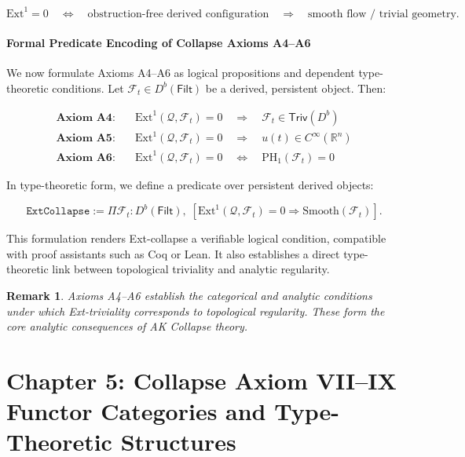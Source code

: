 \documentclass[11pt]{article}
\newtheorem{remark}[theorem]{Remark}
\begin{document}
\[
\mathrm{Ext}^1 = 0 
\quad \Longleftrightarrow \quad 
\text{obstruction-free derived configuration} 
\quad \Rightarrow \quad 
\text{smooth flow / trivial geometry}.
\]

\paragraph{Formal Predicate Encoding of Collapse Axioms A4–A6}

We now formulate Axioms A4–A6 as logical propositions and dependent type-theoretic conditions.  
Let \( \mathcal{F}_t \in D^b(\mathsf{Filt}) \) be a derived, persistent object. Then:

\begin{align*}
\textbf{Axiom A4:} \quad & \mathrm{Ext}^1(\mathcal{Q}, \mathcal{F}_t) = 0 
\quad \Rightarrow \quad \mathcal{F}_t \in \mathsf{Triv}(D^b) \\
\textbf{Axiom A5:} \quad & \mathrm{Ext}^1(\mathcal{Q}, \mathcal{F}_t) = 0 
\quad \Rightarrow \quad u(t) \in C^\infty(\mathbb{R}^n) \\
\textbf{Axiom A6:} \quad & \mathrm{Ext}^1(\mathcal{Q}, \mathcal{F}_t) = 0 
\quad \Leftrightarrow \quad \mathrm{PH}_1(\mathcal{F}_t) = 0
\end{align*}

In type-theoretic form, we define a predicate over persistent derived objects:

\[
\texttt{ExtCollapse} := \Pi \mathcal{F}_t : D^b(\mathsf{Filt}),\; 
\left[
\mathrm{Ext}^1(\mathcal{Q}, \mathcal{F}_t) = 0 \Rightarrow \mathrm{Smooth}(\mathcal{F}_t)
\right].
\]

This formulation renders Ext-collapse a verifiable logical condition, 
compatible with proof assistants such as Coq or Lean.  
It also establishes a direct type-theoretic link between topological triviality and analytic regularity.

\begin{remark}
Axioms A4–A6 establish the categorical and analytic conditions  
under which Ext-triviality corresponds to topological regularity.  
These form the core analytic consequences of AK Collapse theory.
\end{remark}



\section*{Chapter 5: Collapse Axiom VII--IX Functor Categories and Type-Theoretic Structures}
\end{document}
